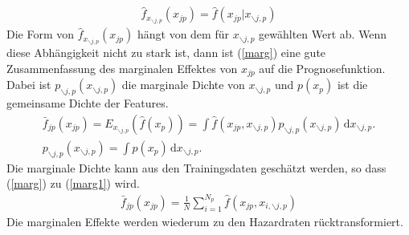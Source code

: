 \begin{align}
	\hat{f}_{x_{\backslash j,p}}(x_{jp}) = \hat{f}(x_{jp}|x_{\backslash j,p})
\end{align}
Die Form von $\hat{f}_{x_{\backslash j,p}}(x_{jp})$ hängt von dem für $x_{\backslash j,p}$ gewählten Wert ab. Wenn diese Abhängigkeit nicht zu stark ist, dann ist (\ref{marg}) eine gute Zusammenfassung des marginalen Effektes von $x_{jp}$ auf die Prognosefunktion. Dabei ist $p_{\backslash j,p}(x_{\backslash j,p})$ die marginale Dichte von $x_{\backslash j,p}$ und $p(x_p)$ ist die gemeinsame Dichte der Features.
\begin{align}
	\bar{f}_{jp}(x_{jp}) = E_{x_{\backslash j,p}}(\hat{f}(x_p)) = \int \! \hat{f}(x_{jp},x_{\backslash j,p}) p_{\backslash j,p}(x_{\backslash j,p}) \, \mathrm{d}x_{\backslash j,p}. \label{marg} \\
	p_{\backslash j,p}(x_{\backslash j,p}) = \int \! p(x_p) \, \mathrm{d}x_{\backslash j,p}.
\end{align}
Die marginale Dichte kann aus den Trainingsdaten geschätzt werden, so dass (\ref{marg}) zu (\ref{marg1}) wird.
\begin{align}
	\bar{f}_{jp}(x_{jp}) = \frac{1}{N} \sum_{i=1}^{N_p} \hat{f}(x_{jp},x_{i,\backslash j,p}) \label{marg1}
\end{align}
Die marginalen Effekte werden wiederum zu den Hazardraten rücktransformiert.
